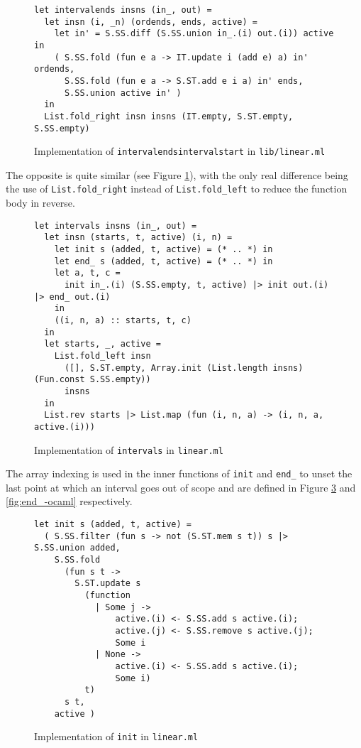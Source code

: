 \documentclass{article}
\begin{document}
\begin{figure}[H]
  \centering
   \begin{minipage}[b]{0.95\textwidth}
     \centering
     \begin{verbatim}
let intervalends insns (in_, out) =
  let insn (i, _n) (ordends, ends, active) =
    let in' = S.SS.diff (S.SS.union in_.(i) out.(i)) active in
    ( S.SS.fold (fun e a -> IT.update i (add e) a) in' ordends,
      S.SS.fold (fun e a -> S.ST.add e i a) in' ends,
      S.SS.union active in' )
  in
  List.fold_right insn insns (IT.empty, S.ST.empty, S.SS.empty)
     \end{verbatim}
     \caption{Implementation of \texttt{intervalendsintervalstart} in \texttt{lib/linear.ml}}\label{fig:intervalends.ml}
   \end{minipage}
\end{figure}


\noindent The opposite is quite similar (see Figure \ref{fig:intervalends.ml}), with the only real difference being the use of \texttt{List.fold\_right} instead of \texttt{List.fold\_left} to reduce the function body in reverse.


\begin{figure}[H]
     \centering
     \begin{verbatim}
let intervals insns (in_, out) =
  let insn (starts, t, active) (i, n) =
    let init s (added, t, active) = (* .. *) in
    let end_ s (added, t, active) = (* .. *) in
    let a, t, c =
      init in_.(i) (S.SS.empty, t, active) |> init out.(i) |> end_ out.(i)
    in
    ((i, n, a) :: starts, t, c)
  in
  let starts, _, active =
    List.fold_left insn
      ([], S.ST.empty, Array.init (List.length insns) (Fun.const S.SS.empty))
      insns
  in
  List.rev starts |> List.map (fun (i, n, a) -> (i, n, a, active.(i)))
     \end{verbatim}
     \caption{Implementation of \texttt{intervals} in \texttt{linear.ml}}\label{fig:intervals-ocaml}
\end{figure}

\noindent The array indexing is used in the inner functions of \texttt{init} and \texttt{end\_} to unset the last point at which an interval goes out of scope and are defined in Figure \ref{fig:init-ocaml} and \ref{fig:end_-ocaml} respectively.

\begin{figure}[H]
     \centering
     \begin{verbatim}
let init s (added, t, active) =
  ( S.SS.filter (fun s -> not (S.ST.mem s t)) s |> S.SS.union added,
    S.SS.fold
      (fun s t ->
        S.ST.update s
          (function
            | Some j ->
                active.(i) <- S.SS.add s active.(i);
                active.(j) <- S.SS.remove s active.(j);
                Some i
            | None ->
                active.(i) <- S.SS.add s active.(i);
                Some i)
          t)
      s t,
    active )
     \end{verbatim}
     \caption{Implementation of \texttt{init} in \texttt{linear.ml}}\label{fig:init-ocaml}
\end{figure}
\end{document}
